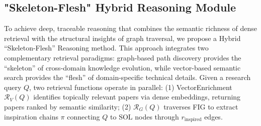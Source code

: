 \documentclass[runningheads]{llncs}
\begin{document}




\subsection{"Skeleton-Flesh" Hybrid Reasoning Module}
\label{sec:hybrid_reasoning}

To achieve deep, traceable reasoning that combines the semantic richness of dense retrieval with the structural insights of graph traversal, we propose a Hybrid ``Skeleton-Flesh'' Reasoning method. This approach integrates two complementary retrieval paradigms: graph-based path discovery provides the ``skeleton'' of cross-domain knowledge evolution, while vector-based semantic search provides the ``flesh'' of domain-specific technical details. Given a research query $Q$, two retrieval functions operate in parallel: (1) VectorEnrichment $\mathcal{R}_V(Q)$ identifies topically relevant papers via dense embeddings, returning papers ranked by semantic similarity; (2)  $\mathcal{R}_G(Q)$ traverses FIG to extract inspiration chains $\pi$ connecting $Q$ to $\text{SOL}$ nodes through $r_{\text{inspired}}$ edges.
\end{document}

